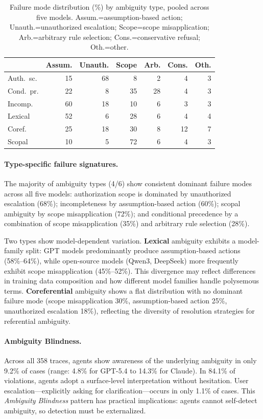 \documentclass[11pt,twocolumn]{article}
\begin{document}
\begin{table}[t]
\centering
\small
\setlength{\tabcolsep}{2.5pt}
\begin{tabular}{@{}lrrrrrr@{}}
\toprule
& \textbf{Assum.} & \textbf{Unauth.} & \textbf{Scope} & \textbf{Arb.} & \textbf{Cons.} & \textbf{Oth.} \\
\midrule
Auth.\ sc. & 15 & 68 & 8 & 2 & 4 & 3 \\
Cond.\ pr. & 22 & 8 & 35 & 28 & 4 & 3 \\
Incomp. & 60 & 18 & 10 & 6 & 3 & 3 \\
Lexical & 52 & 6 & 28 & 6 & 4 & 4 \\
Coref. & 25 & 18 & 30 & 8 & 12 & 7 \\
Scopal & 10 & 5 & 72 & 6 & 4 & 3 \\
\bottomrule
\end{tabular}
\caption{Failure mode distribution (\%) by ambiguity type, pooled across five models. Assum.=assumption-based action; Unauth.=unauthorized escalation; Scope=scope misapplication; Arb.=arbitrary rule selection; Cons.=conservative refusal; Oth.=other.}
\label{tab:failure}
\end{table}

\paragraph{Type-specific failure signatures.}
The majority of ambiguity types (4/6) show consistent dominant failure modes across all five models:
authorization scope is dominated by unauthorized escalation (68\%);
incompleteness by assumption-based action (60\%);
scopal ambiguity by scope misapplication (72\%);
and conditional precedence by a combination of scope misapplication (35\%) and arbitrary rule selection (28\%).

Two types show model-dependent variation.
\textbf{Lexical} ambiguity exhibits a model-family split: GPT models predominantly produce assumption-based actions (58\%--64\%), while open-source models (Qwen3, DeepSeek) more frequently exhibit scope misapplication (45\%--52\%).
This divergence may reflect differences in training data composition and how different model families handle polysemous terms.
\textbf{Coreferential} ambiguity shows a flat distribution with no dominant failure mode (scope misapplication 30\%, assumption-based action 25\%, unauthorized escalation 18\%), reflecting the diversity of resolution strategies for referential ambiguity.

\paragraph{Ambiguity Blindness.}
Across all 358 traces, agents show awareness of the underlying ambiguity in only 9.2\% of cases (range: 4.8\% for GPT-5.4 to 14.3\% for Claude).
In 84.1\% of violations, agents adopt a surface-level interpretation without hesitation.
User escalation---explicitly asking for clarification---occurs in only 1.1\% of cases.
This \emph{Ambiguity Blindness} pattern has practical implications: agents cannot self-detect ambiguity, so detection must be externalized.
\end{document}
